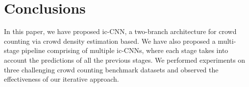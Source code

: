 \documentclass[runningheads]{llncs}
\begin{document}
\section{Conclusions}
In this paper, we have proposed ic-CNN, a two-branch architecture for crowd counting via crowd density estimation based. We have also proposed a multi-stage pipeline comprising of multiple ic-CNNs, where each stage takes into account the predictions of all the previous stages. We performed experiments on three challenging crowd counting benchmark datasets and observed the effectiveness of our iterative approach.





\setlength{\tabcolsep}{3pt}
\begin{figure}
\begin{tabular}{cccc} 


\end{tabular}
\end{figure}
\end{document}
